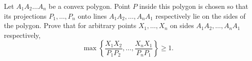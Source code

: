Let $A_1A_2 \ldots A_n$ be a convex polygon. Point $P$ inside this polygon is chosen so that its projections $P_1, \ldots , P_n$ onto lines $A_1A_2, \ldots , A_nA_1$ respectively lie on the sides of the polygon. Prove that for arbitrary points $X_1, \ldots , X_n$ on sides $A_1A_2, \ldots , A_nA_1$ respectively,\[\max \left\{ \frac{X_1X_2}{P_1P_2}, \ldots, \frac{X_nX_1}{P_nP_1} \right\} \geq 1.\]